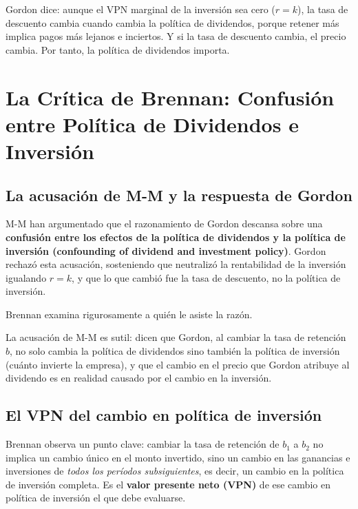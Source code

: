 \documentclass[12pt]{article}
\begin{document}
\begin{intuicion}
Gordon dice: aunque el VPN marginal de la inversi\'on sea cero ($r = k$), la tasa de descuento cambia cuando cambia la pol\'itica de dividendos, porque retener m\'as implica pagos m\'as lejanos e inciertos. Y si la tasa de descuento cambia, el precio cambia. Por tanto, la pol\'itica de dividendos importa.
\end{intuicion}

\section{La Cr\'itica de Brennan: Confusi\'on entre Pol\'itica de Dividendos e Inversi\'on}

\subsection{La acusaci\'on de M-M y la respuesta de Gordon}

M-M han argumentado que el razonamiento de Gordon descansa sobre una \textbf{confusi\'on entre los efectos de la pol\'itica de dividendos y la pol\'itica de inversi\'on (confounding of dividend and investment policy)}. Gordon rechaz\'o esta acusaci\'on, sosteniendo que neutraliz\'o la rentabilidad de la inversi\'on igualando $r = k$, y que lo que cambi\'o fue la tasa de descuento, no la pol\'itica de inversi\'on.

Brennan examina rigurosamente a qui\'en le asiste la raz\'on.

\begin{intuicion}
La acusaci\'on de M-M es sutil: dicen que Gordon, al cambiar la tasa de retenci\'on $b$, no solo cambia la pol\'itica de dividendos sino tambi\'en la pol\'itica de inversi\'on (cu\'anto invierte la empresa), y que el cambio en el precio que Gordon atribuye al dividendo es en realidad causado por el cambio en la inversi\'on.
\end{intuicion}

\subsection{El VPN del cambio en pol\'itica de inversi\'on}

Brennan observa un punto clave: cambiar la tasa de retenci\'on de $b_1$ a $b_2$ no implica un cambio \'unico en el monto invertido, sino un cambio en las ganancias e inversiones de \textit{todos los per\'iodos subsiguientes}, es decir, un cambio en la pol\'itica de inversi\'on completa. Es el \textbf{valor presente neto (VPN)} de ese cambio en pol\'itica de inversi\'on el que debe evaluarse.
\end{document}
